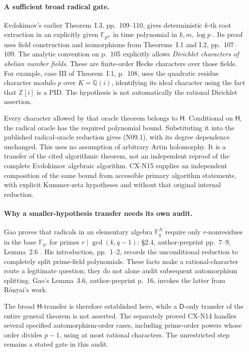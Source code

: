 \paragraph{A sufficient broad radical gate.}
Evdokimov's earlier Theorem~I.3, pp.~109--110, gives deterministic
\(k\)-th root extraction in an explicitly given \(\mathbb F_{p^m}\)
in time polynomial in \(k,m,\log p\) \cite{CXNEvdokimov89}.
Its proof uses field construction and isomorphisms from
Theorems~I.1 and I.2, pp.~107--109. The analytic convention on p.~105
explicitly allows \emph{Dirichlet characters of abelian number fields}.
These are finite-order Hecke characters over those fields.
For example, case III of Theorem~I.1, p.~108, uses the quadratic
residue character modulo \(p\) over \(K=\mathbb Q(i)\), identifying
its ideal character using the fact that \(\mathbb Z[i]\) is a PID.
The hypothesis is not automatically the rational Dirichlet assertion.

Every character allowed by that oracle theorem belongs to
\(\mathsf H\). Conditional on \(\mathsf H\), the radical oracle has
the required polynomial bound. Substituting it into the published
radical-oracle reduction gives (N09.1), with its degree dependence
unchanged. This uses no assumption of arbitrary Artin holomorphy.
It is a transfer of the cited algorithmic theorem, not an independent
reproof of the complete Evdokimov algebraic algorithm.
CX-N15 supplies an independent composition of the same bound from
accessible primary algorithm statements, with explicit Kummer-zeta
hypotheses and without that original internal reduction.

\paragraph{Why a smaller-hypothesis transfer needs its own audit.}
Gao proves that radicals in an elementary algebra
\(\mathbb F_q^N\) require only \(r\)-nonresidues in the base
\(\mathbb F_q\), for primes \(r\mid\gcd(k,q-1)\):
\S2.4, author-preprint pp.~7--9, Lemma~2.6 \cite{CXNGao01}.
His introduction, pp.~1--2, records the unconditional reduction to
completely split prime-field polynomials.
These facts make a rational-character route a legitimate question;
they do not alone audit subsequent automorphism splitting.
Gao's Lemma~3.6, author-preprint p.~16, invokes the latter from
R\'onyai's work.

The broad \(\mathsf H\)-transfer is therefore established here, while
a \(\mathsf D\)-only transfer of the entire general theorem is not
asserted. The separately proved CX-N14 handles several specified
automorphism-order cases, including prime-order powers whose order divides
\(p-1\), using at most rational characters. The unrestricted step
remains a stated gate in this audit.

